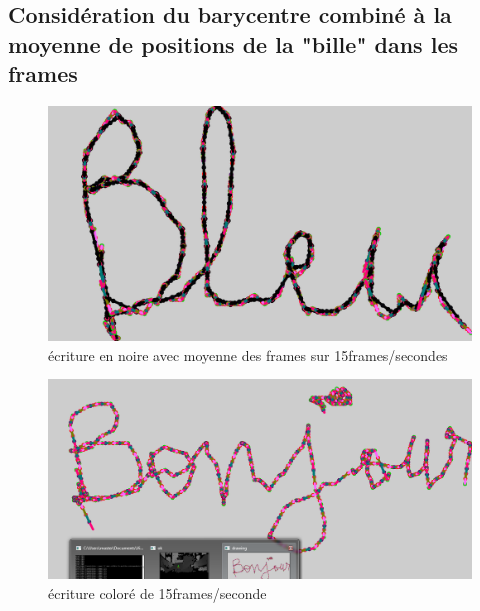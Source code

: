\documentclass[12pt,a4paper,oneside]{book}
\begin{document}
	\subsection{Considération du barycentre combiné à la moyenne de positions de la "bille" dans les frames}
	
	
	\begin{figure}[H]
		
		\centering
		\includegraphics[scale=0.5]{images/bleubarycentremoyenne.png}
		\caption{écriture en noire avec moyenne des frames sur 15frames/secondes}
		\label{fig13}
		
	\end{figure}
	
	\begin{figure}[H]
		\centering
		\includegraphics[scale=0.5]{images/bnjr.png}
		\caption{écriture coloré de 15frames/seconde}
		
	\end{figure}
\end{document}
